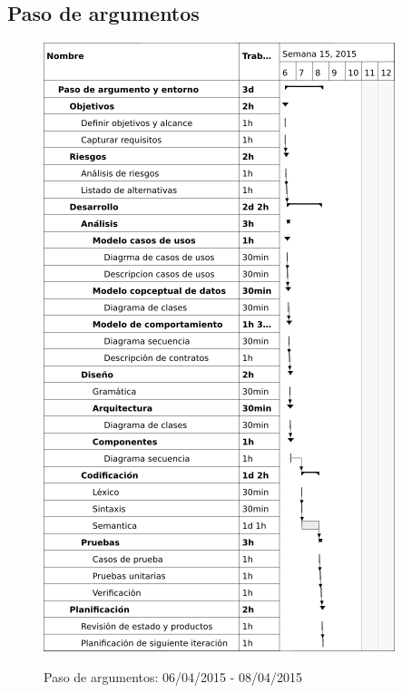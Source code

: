 \subsection{Paso de argumentos}
\begin{center}
\begin{figure}[H]
\centering
\includegraphics[scale=1]{planning/20-paso-argumentos.png} \\
\caption{Paso de argumentos: 06/04/2015 - 08/04/2015 }
\end{figure}
\end{center}


